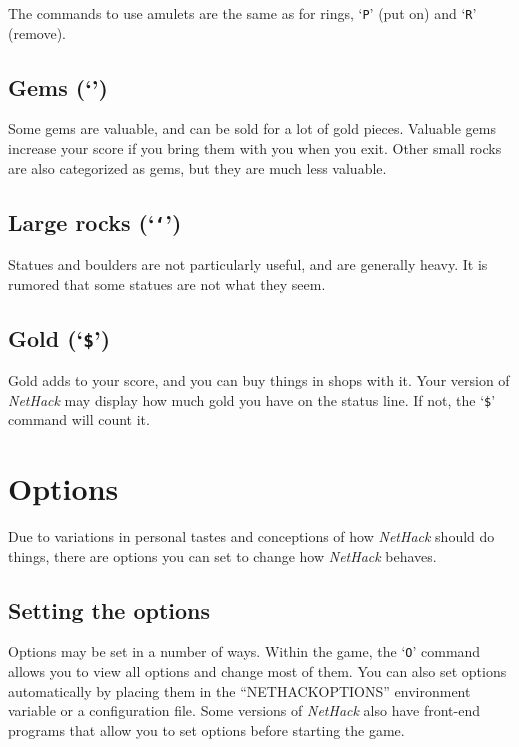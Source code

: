 The commands to use amulets are the same as for rings, `{\tt P}' (put on)
and `{\tt R}' (remove).

\subsection*{Gems (`{\tt *}')}

Some gems are valuable, and can be sold for a lot of gold pieces.
Valuable gems increase your score if you bring them with you when you
exit.  Other small rocks are also categorized as gems, but they are
much less valuable.

\subsection*{Large rocks (`{\tt `}')}
Statues and boulders are not particularly useful, and are generally
heavy.  It is rumored that some statues are not what they seem.

\subsection*{Gold (`{\tt \$}')}

Gold adds to your score, and you can buy things in shops with it.
Your version of {\it NetHack\/} may display how much gold you have on the
status line.  If not, the `{\tt \$}' command will count it.

\section{Options}

Due to variations in personal tastes and conceptions of how {\it NetHack\/}
should do things, there are options you can set to change how {\it NetHack\/}
behaves.

\subsection*{Setting the options}

Options may be set in a number of ways.  Within the game, the `{\tt O}'
command allows you to view all options and change most of them.
You can also set options automatically by placing them in the
``NETHACKOPTIONS'' environment variable or a configuration file.
Some versions of {\it NetHack\/} also have front-end programs that allow
you to set options before starting the game.

